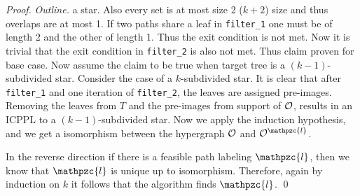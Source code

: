\documentclass[11pt,
               envcountsect,
               envcountsame]
               {../lib/llncs2e/llncs}
\def\cF{{\cal F}}
\def\cO{{\cal O}}
\def\bO{\mathbb O}
\def\cl{\mathpzc{l}}
\def\lndisplay{1}
\begin{document}
\begin{proof} {\em Outline.}
  a star. Also every set is at most size 2 ($k+2$) size and thus
  overlaps are at most 1. If two paths share a leaf in {\tt filter\_1}
  one must be of length 2 and the other of length 1. Thus the exit
  condition is not met. Now it is trivial that the exit condition in
  {\tt filter\_2} is also not met. Thus claim proven for base case.
  Now assume the claim to be true when target tree is a
  $(k-1)$-subdivided star. Consider the case of a $k$-subdivided
  star. It is clear that after {\tt filter\_1} and one iteration of
  {\tt filter\_2}, the leaves are assigned pre-images.  Removing the
  leaves from $T$ and the pre-images from support of $\cO$, results in
  an ICPPL to a $(k-1)$-subdivided star.  Now we apply the induction
  hypothesis, and we get a isomorphism between the hypergraph $\cO$
  and $\cO^\cl$.

  \noindent
  In the reverse direction if there is a feasible path labeling $\cl$,
  then we know that $\cl$ is unique up to isomorphism.  Therefore,
  again by induction on $k$ it follows that the algorithm finds $\cl$.
  \qed
\end{proof}


%
%



\end{document}
